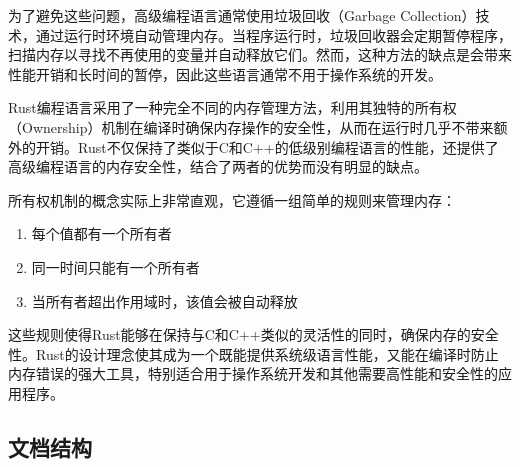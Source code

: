为了避免这些问题，高级编程语言通常使用垃圾回收（Garbage Collection）技术，通过运行时环境自动管理内存。当程序运行时，垃圾回收器会定期暂停程序，扫描内存以寻找不再使用的变量并自动释放它们。然而，这种方法的缺点是会带来性能开销和长时间的暂停，因此这些语言通常不用于操作系统的开发。

Rust编程语言采用了一种完全不同的内存管理方法，利用其独特的所有权（Ownership）机制在编译时确保内存操作的安全性，从而在运行时几乎不带来额外的开销。Rust不仅保持了类似于C和C++的低级别编程语言的性能，还提供了高级编程语言的内存安全性，结合了两者的优势而没有明显的缺点。

所有权机制的概念实际上非常直观，它遵循一组简单的规则来管理内存：

\begin{enumerate}
    \item 每个值都有一个所有者
    \item 同一时间只能有一个所有者
    \item 当所有者超出作用域时，该值会被自动释放
\end{enumerate}

这些规则使得Rust能够在保持与C和C++类似的灵活性的同时，确保内存的安全性。Rust的设计理念使其成为一个既能提供系统级语言性能，又能在编译时防止内存错误的强大工具，特别适合用于操作系统开发和其他需要高性能和安全性的应用程序。

\subsection{文档结构}